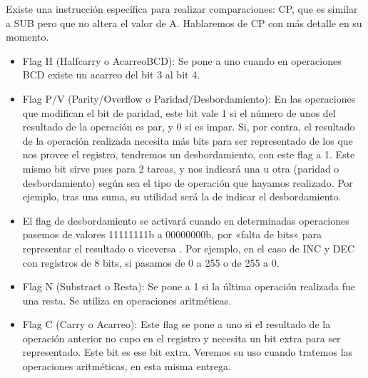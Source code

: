 \documentclass[letterpaper,10pt,spanish]{sphinxmanual}
\begin{document}
Existe una instrucción específica para realizar comparaciones: CP, que es similar a SUB pero que no altera el valor de A. Hablaremos de CP con más detalle en su momento.
\begin{itemize}
\item {} 
Flag H (Half\sphinxhyphen{}carry o Acarreo\sphinxhyphen{}BCD): Se pone a uno cuando en operaciones BCD existe un acarreo del bit 3 al bit 4.

\item {} 
Flag P/V (Parity/Overflow o Paridad/Desbordamiento): En las operaciones que modifican el bit de paridad, este bit vale 1 si el número de unos del resultado de la operación es par, y 0 si es impar. Si, por contra, el resultado de la operación realizada necesita más bits para ser representado de los que nos provee el registro, tendremos un desbordamiento, con este flag a 1. Este mismo bit sirve pues para 2 tareas, y nos indicará una u otra (paridad o desbordamiento) según sea el tipo de operación que hayamos realizado. Por ejemplo, tras una suma, su utilidad será la de indicar el desbordamiento.

\item {} 
El flag de desbordamiento se activará cuando en determinadas operaciones pasemos de valores 11111111b a 00000000b, por «falta de bits» para representar el resultado o viceversa . Por ejemplo, en el caso de INC y DEC con registros de 8 bits, si pasamos de 0 a 255 o de 255 a 0.

\item {} 
Flag N (Substract o Resta): Se pone a 1 si la última operación realizada fue una resta. Se utiliza en operaciones aritméticas.

\item {} 
Flag C (Carry o Acarreo): Este flag se pone a uno si el resultado de la operación anterior no cupo en el registro y necesita un bit extra para ser representado. Este bit es ese bit extra. Veremos su uso cuando tratemos las operaciones aritméticas, en esta misma entrega.

\end{itemize}
\end{document}
